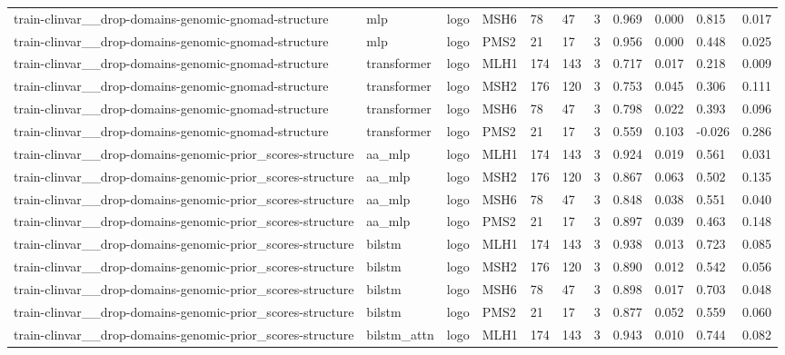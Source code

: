 \begin{table}[t]
\begin{tabular}{lllllllllll}
train-clinvar\_\_drop-domains-genomic-gnomad-structure & mlp & logo & MSH6 & 78 & 47 & 3 & 0.969 & 0.000 & 0.815 & 0.017 \\
train-clinvar\_\_drop-domains-genomic-gnomad-structure & mlp & logo & PMS2 & 21 & 17 & 3 & 0.956 & 0.000 & 0.448 & 0.025 \\
train-clinvar\_\_drop-domains-genomic-gnomad-structure & transformer & logo & MLH1 & 174 & 143 & 3 & 0.717 & 0.017 & 0.218 & 0.009 \\
train-clinvar\_\_drop-domains-genomic-gnomad-structure & transformer & logo & MSH2 & 176 & 120 & 3 & 0.753 & 0.045 & 0.306 & 0.111 \\
train-clinvar\_\_drop-domains-genomic-gnomad-structure & transformer & logo & MSH6 & 78 & 47 & 3 & 0.798 & 0.022 & 0.393 & 0.096 \\
train-clinvar\_\_drop-domains-genomic-gnomad-structure & transformer & logo & PMS2 & 21 & 17 & 3 & 0.559 & 0.103 & -0.026 & 0.286 \\
train-clinvar\_\_drop-domains-genomic-prior\_scores-structure & aa\_mlp & logo & MLH1 & 174 & 143 & 3 & 0.924 & 0.019 & 0.561 & 0.031 \\
train-clinvar\_\_drop-domains-genomic-prior\_scores-structure & aa\_mlp & logo & MSH2 & 176 & 120 & 3 & 0.867 & 0.063 & 0.502 & 0.135 \\
train-clinvar\_\_drop-domains-genomic-prior\_scores-structure & aa\_mlp & logo & MSH6 & 78 & 47 & 3 & 0.848 & 0.038 & 0.551 & 0.040 \\
train-clinvar\_\_drop-domains-genomic-prior\_scores-structure & aa\_mlp & logo & PMS2 & 21 & 17 & 3 & 0.897 & 0.039 & 0.463 & 0.148 \\
train-clinvar\_\_drop-domains-genomic-prior\_scores-structure & bilstm & logo & MLH1 & 174 & 143 & 3 & 0.938 & 0.013 & 0.723 & 0.085 \\
train-clinvar\_\_drop-domains-genomic-prior\_scores-structure & bilstm & logo & MSH2 & 176 & 120 & 3 & 0.890 & 0.012 & 0.542 & 0.056 \\
train-clinvar\_\_drop-domains-genomic-prior\_scores-structure & bilstm & logo & MSH6 & 78 & 47 & 3 & 0.898 & 0.017 & 0.703 & 0.048 \\
train-clinvar\_\_drop-domains-genomic-prior\_scores-structure & bilstm & logo & PMS2 & 21 & 17 & 3 & 0.877 & 0.052 & 0.559 & 0.060 \\
train-clinvar\_\_drop-domains-genomic-prior\_scores-structure & bilstm\_attn & logo & MLH1 & 174 & 143 & 3 & 0.943 & 0.010 & 0.744 & 0.082 \\

\end{tabular}
\end{table}
